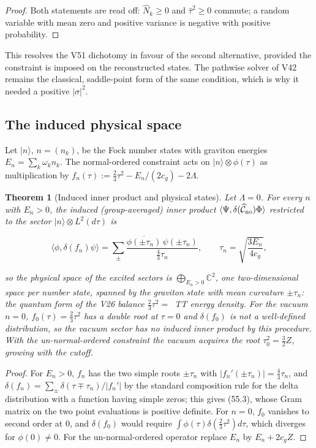 \documentclass[11pt]{article}
\newtheorem{theorem}{Theorem}[section]
\theoremstyle{remark}
\begin{document}
\begin{proof}
Both statements are read off: \(\widehat N_k\geq0\) and \(\hat\tau^2\geq0\)
commute; a random variable with mean zero and positive variance is
negative with positive probability.
\end{proof}

This resolves the V51 dichotomy in favour of the second alternative,
provided the constraint is imposed on the reconstructed states.  The
pathwise solver of V42 remains the classical, saddle-point form of the
same condition, which is why it needed a positive \(|\sigma|^2\).

\subsection{The induced physical space}

Let \(|n\rangle\), \(n=(n_k)\), be the Fock number states with
graviton energies \(E_n=\sum_k\omega_kn_k\).  The normal-ordered
constraint acts on \(|n\rangle\otimes\phi(\tau)\) as multiplication by
\(f_n(\tau):=\tfrac23\tau^2-E_n/(2c_g)-2\Lambda\).

\begin{theorem}[Induced inner product and physical states]
\label{thm:v19v52-induced}
Let \(\Lambda=0\).  For every \(n\) with \(E_n>0\), the induced
(group-averaged) inner product
\(\langle\Psi,\delta(\widehat{\cal C}_{\rm no})\Phi\rangle\) restricted to
the sector \(|n\rangle\otimes L^2(d\tau)\) is

\[
 \langle\phi,\delta(f_n)\psi\rangle
 =\sum_{\pm}\frac{\overline{\phi(\pm\tau_n)}\,\psi(\pm\tau_n)}{\tfrac43\tau_n},
 \qquad
 \tau_n=\sqrt{\frac{3E_n}{4c_g}},                                      \tag{55.3}
\]

so the physical space of the excited sectors is
\(\bigoplus_{E_n>0}\mathbb C^2\), one two-dimensional space per number
state, spanned by the graviton state with mean curvature \(\pm\tau_n\):
the quantum form of the V26 balance \(\tfrac23\tau^2=\)~TT energy
density.  For the vacuum \(n=0\), \(f_0(\tau)=\tfrac23\tau^2\) has a
double root at \(\tau=0\) and \(\delta(f_0)\) is not a well-defined
distribution, so the vacuum sector has no induced inner product by
this procedure.  With the un-normal-ordered constraint the vacuum
acquires the root \(\tau_0^2=\tfrac32Z\), growing with the cutoff.
\end{theorem}

\begin{proof}
For \(E_n>0\), \(f_n\) has the two simple roots \(\pm\tau_n\) with
\(|f_n'(\pm\tau_n)|=\tfrac43\tau_n\), and \(\delta(f_n)=\sum_\pm\delta(\tau\mp\tau_n)/|f_n'|\)
by the standard composition rule for the delta distribution with a
function having simple zeros; this gives (55.3), whose Gram matrix on
the two point evaluations is positive definite.  For \(n=0\), \(f_0\)
vanishes to second order at \(0\), and \(\delta(f_0)\) would require
\(\int\phi(\tau)\delta(\tfrac23\tau^2)d\tau\), which diverges for
\(\phi(0)\neq0\).  For the un-normal-ordered operator replace \(E_n\)
by \(E_n+2c_gZ\).
\end{proof}
\end{document}
